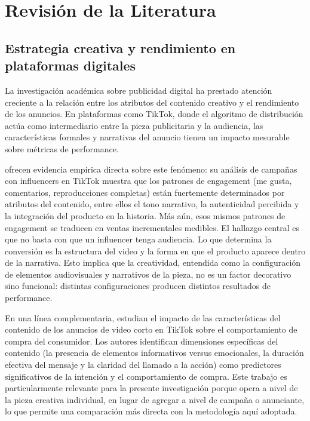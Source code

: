 \documentclass[12pt, a4paper]{report}
\begin{document}
\chapter{Revisión de la Literatura}

\section{Estrategia creativa y rendimiento en plataformas digitales}

La investigación académica sobre publicidad digital ha prestado atención creciente a la relación entre
los atributos del contenido creativo y el rendimiento de los anuncios. En plataformas 
como TikTok, donde el algoritmo de distribución actúa como intermediario entre la pieza publicitaria
y la audiencia, las características formales y narrativas del anuncio tienen un impacto mesurable sobre
métricas de performance.

\citet{yang2025} ofrecen evidencia empírica directa sobre este fenómeno: su análisis de campañas con
influencers en TikTok muestra que los patrones de engagement (me gusta, comentarios, reproducciones
completas) están fuertemente determinados por atributos del contenido, entre ellos el tono narrativo,
la autenticidad percibida y la integración del producto en la historia. Más aún, esos mismos patrones
de engagement se traducen en ventas incrementales medibles. El hallazgo central es que no basta con
que un influencer tenga audiencia. Lo que determina la conversión es la estructura del video y la forma
en que el producto aparece dentro de la narrativa. Esto implica que la creatividad, entendida como la
configuración de elementos audiovisuales y narrativos de la pieza, no es un factor decorativo sino
funcional: distintas configuraciones producen distintos resultados de performance.

En una línea complementaria, \citet{meng2024} estudian el impacto de las características del contenido
de los anuncios de video corto en TikTok sobre el comportamiento de compra del consumidor. Los autores
identifican dimensiones específicas del contenido (la presencia de elementos informativos versus
emocionales, la duración efectiva del mensaje y la claridad del llamado a la acción) como predictores
significativos de la intención y el comportamiento de compra. Este trabajo es particularmente relevante
para la presente investigación porque opera a nivel de la pieza creativa individual, en lugar de
agregar a nivel de campaña o anunciante, lo que permite una comparación más directa con la metodología
aquí adoptada.
\end{document}
